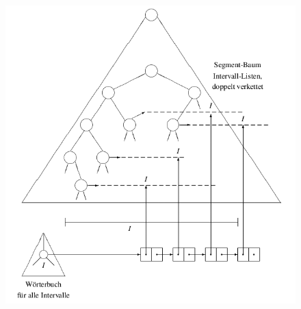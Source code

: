\documentclass[a4paper]{book}
\begin{document}
\begin{figure}[H]
\centering
\includegraphics[scale=0.3]{Figures/segtreew.png}
\end{figure}
\end{document}
